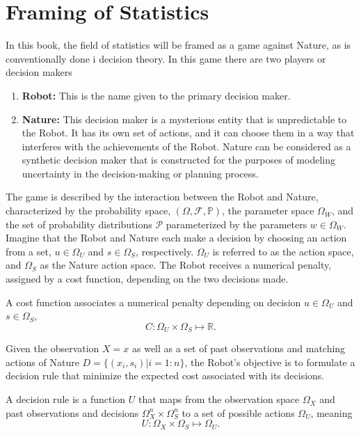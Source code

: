 \chapter{Framing of Statistics}
\label{chp:framing_statistics}
In this book, the field of statistics will be framed as a game against Nature, as is conventionally done i decision theory. In this game there are two players or decision makers
\begin{enumerate}
	\item \textbf{Robot:} This is the name given to the primary decision maker.
	
	\item \textbf{Nature:} This decision maker is a mysterious entity that is unpredictable to the Robot. It has its own set of actions, and it can choose them in a way that interferes with the achievements of the Robot. Nature can be considered as a synthetic decision maker that is constructed for the purposes of modeling uncertainty in the decision-making or planning process.
\end{enumerate}
The game is described by the interaction between the Robot and Nature, characterized by the probability space, $(\Omega, \mathcal{F}, \mathbb{P})$, the parameter space $\Omega_W$, and the set of probability distributions $\mathcal{P}$ parameterized by the parameters $w\in \Omega_W$. Imagine that the Robot and Nature each make a decision by choosing an action from a set, $u \in \Omega_U$ and $s \in \Omega_S$, respectively. $\Omega_U$ is referred to as the action space, and $\Omega_S$ as the Nature action space. The Robot receives a numerical penalty, assigned by a cost function, depending on the two decisions made.
\begin{definition}
	\label{def:cost_function}
	A cost function associates a numerical penalty depending on decision $u \in \Omega_U$ and $s \in \Omega_S$,
	\begin{equation}
		C: \Omega_U \times \Omega_S \mapsto \mathbb{R}.
	\end{equation}
\end{definition}
Given the observation $X=x$ as well as a set of past observations and matching actions of Nature $D = \{(x_i,s_i)|i=1:n\}$, the Robot's objective is to formulate a decision rule that minimize the expected cost associated with its decisions.
\begin{definition}
	\label{def:decision_rule}
	A decision rule is a function \( U \) that maps from the observation space \( \Omega_X \) and past observations and decisions \( \Omega_X^n \times \Omega_S^n \) to a set of possible actions \( \Omega_U \), meaning
	\begin{equation}
		U: \Omega_X\times \Omega_S \mapsto \Omega_U.
	\end{equation}
\end{definition}
